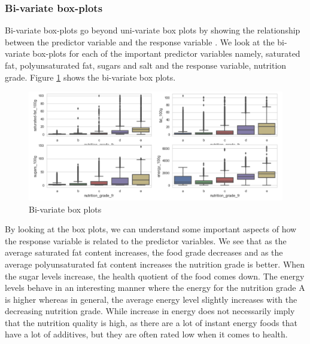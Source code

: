 \documentclass[sigconf]{acmart}
\begin{document}
\subsubsection{Bi-variate box-plots} Bi-variate box-plots go beyond uni-variate box plots by showing the relationship between the predictor variable and the response variable \cite{book-tan}. We look at the bi-variate box-plots for each of the important predictor variables namely, saturated fat, polyunsaturated fat, sugars and salt and the response variable, nutrition grade. Figure \ref{fig:Fig2} shows the bi-variate box plots. \\

\begin{figure}
\includegraphics[width=1.0\columnwidth]{images/fig2.png}
\caption{Bi-variate box plots \cite{code-base}}
\label{fig:Fig2}
\end{figure}

By looking at the box plots, we can understand some important aspects of how the response variable is related to the predictor variables. We see that as the average saturated fat content increases, the food grade decreases and as the average polyunsaturated fat content increases the nutrition grade is better. When the sugar levels increase, the health quotient of the food comes down. The energy levels behave in an interesting manner where the energy for the nutrition grade A is higher whereas in general, the average energy level slightly increases with the decreasing nutrition grade. While increase in energy does not necessarily imply that the nutrition quality is high, as there are a lot of instant energy foods that have a lot of additives, but they are often rated low when it comes to health. \\
\end{document}
